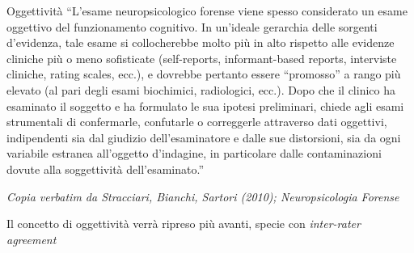 \documentclass[
  ignorenonframetext,
]{beamer}
\begin{document}
\begin{frame}{Oggettività}
\label{oggettivituxe0-1}
\footnotesize``L'esame neuropsicologico forense viene spesso considerato
un esame oggettivo del funzionamento cognitivo. In un'ideale gerarchia
delle sorgenti d'evidenza, tale esame si collocherebbe molto più in alto
rispetto alle evidenze cliniche più o meno sofisticate (self-reports,
informant-based reports, interviste cliniche, rating scales, ecc.), e
dovrebbe pertanto essere ``promosso'' a rango più elevato (al pari degli
esami biochimici, radiologici, ecc.). Dopo che il clinico ha esaminato
il soggetto e ha formulato le sua ipotesi preliminari, chiede agli esami
strumentali di confermarle, confutarle o correggerle attraverso dati
oggettivi, indipendenti sia dal giudizio dell'esaminatore e dalle sue
distorsioni, sia da ogni variabile estranea all'oggetto d'indagine, in
particolare dalle contaminazioni dovute alla soggettività
dell'esaminato.''

\begin{flushright}
\emph{Copia verbatim da  Stracciari, Bianchi, Sartori (2010); Neuropsicologia Forense}
\end{flushright}

Il concetto di oggettività verrà ripreso più avanti, specie con
\emph{inter-rater agreement}
\end{frame}
\end{document}

